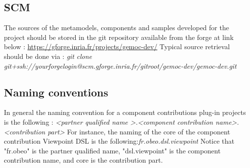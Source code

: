 \documentclass{gemoc} %
\begin{document}
\subsection{SCM}
The sources of the metamodels, components and samples developed for the project should be stored in the git repository available from the forge at link below :\newline
\url{https://gforge.inria.fr/projects/gemoc-dev/}
\newline\newline
Typical source retrieval should be done via :\newline
\textit{git clone git+ssh://yourforgelogin@scm.gforge.inria.fr/gitroot/gemoc-dev/gemoc-dev.git}
\subsection{Naming conventions}
In general the naming convention for a component contributions plug-in projects is the following :
\newline
\textit{\textless partner qualified name \textgreater.\textless component contribution name\textgreater .\textless contribution part\textgreater }
\newline\newline
For instance, the naming of the core of the component contribution Viewpoint DSL is the following:\textit{fr.obeo.dsl.viewpoint}
\newline
Notice that "fr.obeo" is the partner qualified name, "dsl.viewpoint" is the component contribution name, and core is the contribution part.
\newline
\end{document}
